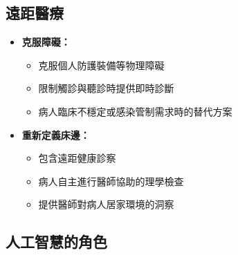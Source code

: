 \documentclass[11pt,a4paper]{article}
\begin{document}
\subsection{遠距醫療}

\begin{itemize}
    \item \textbf{克服障礙：}
    \begin{itemize}
        \item 克服個人防護裝備等物理障礙
        \item 限制觸診與聽診時提供即時診斷
        \item 病人臨床不穩定或感染管制需求時的替代方案
    \end{itemize}
    
    \item \textbf{重新定義床邊：}
    \begin{itemize}
        \item 包含遠距健康診察
        \item 病人自主進行醫師協助的理學檢查
        \item 提供醫師對病人居家環境的洞察
    \end{itemize}
\end{itemize}

\subsection{人工智慧的角色}
\end{document}
